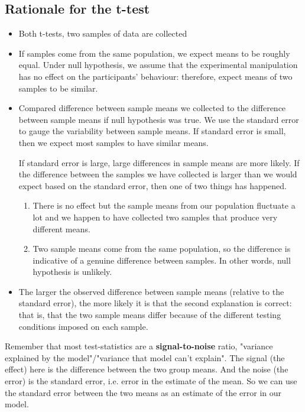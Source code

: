 \subsection{Rationale for the t-test}
\begin{itemize}
\item Both t-tests, two samples of data are collected
\item If samples come from the same population, we expect means to be roughly equal. Under null hypothesis, we assume that the experimental manipulation has no effect on the participants' behaviour: therefore, expect means of two samples to be similar.
\item Compared difference between sample means we collected to the difference between sample means if null hypothesis was true. We use the standard error to gauge the variability between sample means. If standard error is small, then we expect most samples to have similar means. 

If standard error is large, large differences in sample means are more likely. If the difference between the samples we have collected is larger than we would expect based on the standard error, then one of two things has happened.
	\begin{enumerate}
		\item There is no effect but the sample means from our population fluctuate a lot and we happen to have collected two samples that produce very different means.
		\item Two sample means come from the same population, so the difference is indicative of a genuine difference between samples. In other words, null hypothesis is unlikely.
	\end{enumerate}
\item The larger the observed difference between sample means (relative to the standard error), the more likely it is that the second explanation is correct: that is, that the two sample means differ because of the different testing conditions imposed on each sample. 
\end{itemize}

Remember that most test-statistics are a \textbf{signal-to-noise} ratio, "variance explained by the model"/"variance that model can't explain". The signal (the effect) here is the difference between the two group means. And the noise (the error) is the standard error, i.e. error in the estimate of the mean. So we can use the standard error between the two means as an estimate of the error in our model.

